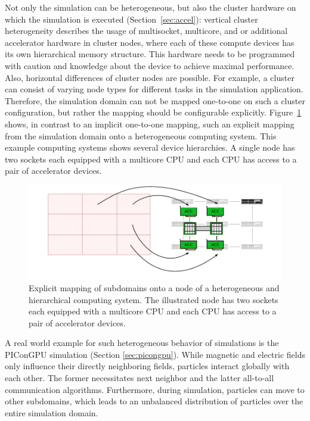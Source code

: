 Not only the simulation can be heterogeneous, but also the cluster
hardware on which the simulation is executed
(Section~\ref{sec:accel}): vertical cluster heterogeneity describes
the usage of multisocket, multicore, and or additional accelerator
hardware in cluster nodes, where each of these compute devices has its
own hierarchical memory structure. This hardware needs to be
programmed with caution and knowledge about the device to achieve
maximal performance.  Also, horizontal differences of cluster nodes
are possible. For example, a cluster can consist of varying node types
for different tasks in the simulation application. Therefore, the
simulation domain can not be mapped one-to-one on such a cluster
configuration, but rather the mapping should be configurable
explicitly. Figure~\ref{fig:heterogeneous_cluster_node} shows, in
contrast to an implicit one-to-one mapping, such an explicit mapping from the
simulation domain onto a heterogeneous computing system. This example
computing systems shows several device hierarchies. A single node has
two sockets each equipped with a multicore CPU and each CPU has access
to a pair of accelerator devices.

\begin{figure}[H]
  \centering
  \includegraphics[width=\textwidth]{graphics/30_heterogeneous_cluster_node}
  \caption{Explicit mapping of subdomains onto a node of a
    heterogeneous and hierarchical computing system. The illustrated
    node has two sockets each equipped with a multicore CPU and each
    CPU has access to a pair of accelerator devices.}
  \label{fig:heterogeneous_cluster_node}
\end{figure}

A real world example for such heterogeneous behavior of simulations is
the PIConGPU simulation (Section \ref{sec:picongpu}). While magnetic
and electric fields only influence their directly neighboring fields,
particles interact globally with each other. The former necessitates
next neighbor and the latter all-to-all communication
algorithms. Furthermore, during simulation, particles can move to other
subdomains, which leads to an unbalanced distribution of particles
over the entire simulation domain.

